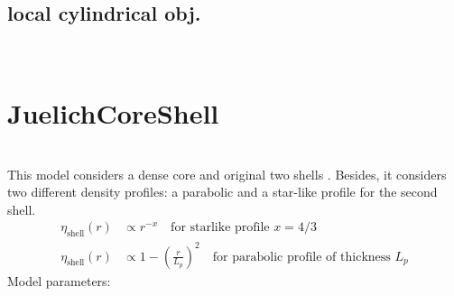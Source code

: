 \subsection{local cylindrical obj.} ~\\
\label{plugin:LocalCylindrical)}


\clearpage
\section{JuelichCoreShell} ~\\

This model considers a dense core and original two shells
\cite{Willner2000}. Besides, it considers two different density
profiles: a parabolic and a star-like profile for the second shell.
\begin{align}
\eta_\text{shell}(r) & \propto r^{-x} \quad \text{for starlike profile $x=4/3$}\\
\eta_\text{shell}(r) & \propto 1-\left(\frac{r}{L_p}\right)^{2}
\quad \text{for parabolic profile of thickness $L_p$}
\end{align}
Model parameters:
